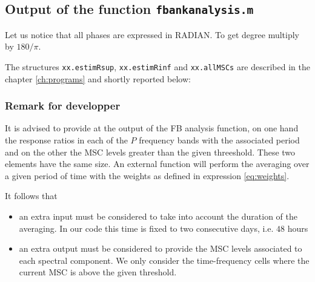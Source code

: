 \newpage\clearpage
\subsection{Output of the function {\tt fbankanalysis.m}}

Let us notice that all phases are expressed in RADIAN. To get degree multiply by $180/\pi$.

{\small}

The structures {\tt xx.estimRsup}, {\tt xx.estimRinf} and {\tt xx.allMSCs}  are described in the chapter \ref{ch:programs} and shortly reported below:

  {\small }

\subsubsection{Remark for developper}

It is advised to provide at the output of the FB analysis function, on one hand the response ratios in each of the $P$ frequency bands  with the associated period and on the other the MSC levels greater than the given threeshold. These two elements have the same size. An external function will perform the averaging over a given period of time with the weights as defined in expression \ref{eq:weights}.

It follows that 
\begin{itemize}
\item
 an extra input must be considered to take into account the duration of the averaging. In our code this time is fixed to two consecutive days, i.e. $48$ hours
\item
 an extra output must be considered to provide the MSC levels associated to each spectral component. We only consider the time-frequency cells where the current MSC is above the given threshold.

\end{itemize}

